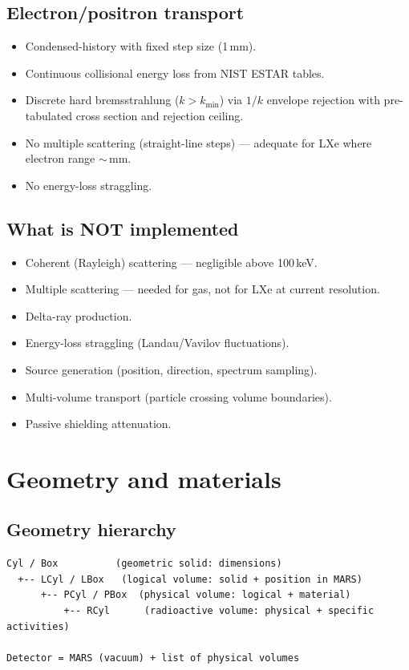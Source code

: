 \documentclass{article}
\begin{document}
\subsection{Electron/positron transport}

\begin{itemize}
  \item Condensed-history with fixed step size (1\,mm).
  \item Continuous collisional energy loss from NIST ESTAR tables.
  \item Discrete hard bremsstrahlung ($k > k_{\min}$) via $1/k$ envelope rejection with pre-tabulated cross section and rejection ceiling.
  \item No multiple scattering (straight-line steps) --- adequate for LXe where electron range $\sim$\,mm.
  \item No energy-loss straggling.
\end{itemize}

\subsection{What is NOT implemented}

\begin{itemize}
  \item Coherent (Rayleigh) scattering --- negligible above 100\,keV.
  \item Multiple scattering --- needed for gas, not for LXe at current resolution.
  \item Delta-ray production.
  \item Energy-loss straggling (Landau/Vavilov fluctuations).
  \item Source generation (position, direction, spectrum sampling).
  \item Multi-volume transport (particle crossing volume boundaries).
  \item Passive shielding attenuation.
\end{itemize}

\section{Geometry and materials}

\subsection{Geometry hierarchy}

\begin{verbatim}
Cyl / Box          (geometric solid: dimensions)
  +-- LCyl / LBox   (logical volume: solid + position in MARS)
      +-- PCyl / PBox  (physical volume: logical + material)
          +-- RCyl      (radioactive volume: physical + specific activities)

Detector = MARS (vacuum) + list of physical volumes
\end{verbatim}
\end{document}
